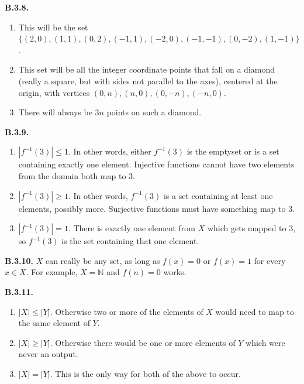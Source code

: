 \documentclass[10pt,]{book}
\theoremstyle{plain}
\theoremstyle{definition}
\theoremstyle{definition}
\theoremstyle{definition}
\theoremstyle{definition}
\numberwithin{equation}{chapter}
\def\N{\mathbb N}
\def\inv{^{-1}}
\begin{document}
%
\par\smallskip
\noindent\textbf{B.3.8.} \hypertarget{p-1834}{}%
\leavevmode%
\begin{enumerate}[label=(\alph*)]
\item\hypertarget{li-602}{}\hypertarget{p-1835}{}%
This will be the set \(\{(2,0), (1,1), (0,2), (-1,1), (-2,0), (-1,-1), (0,-2), (1,-1)\}\).%
\item\hypertarget{li-603}{}\hypertarget{p-1836}{}%
This set will be all the integer coordinate points that fall on a diamond (really a square, but with sides not parallel to the axes), centered at the origin, with vertices \((0,n), (n,0), (0,-n), (-n,0)\).%
\item\hypertarget{li-604}{}\hypertarget{p-1837}{}%
There will always be \(3n\) points on such a diamond.%
\end{enumerate}
%
\par\smallskip
\noindent\textbf{B.3.9.} \hypertarget{p-1842}{}%
\leavevmode%
\begin{enumerate}[label=(\alph*)]
\item\hypertarget{li-608}{}\hypertarget{p-1843}{}%
\(|f\inv(3)| \le 1\). In other words, either \(f\inv(3)\) is the emptyset or is a set containing exactly one element. Injective functions cannot have two elements from the domain both map to 3.%
\item\hypertarget{li-609}{}\hypertarget{p-1844}{}%
\(|f\inv(3)| \ge 1\). In other words, \(f\inv(3)\) is a set containing at least one elements, possibly more. Surjective functions must have something map to 3.%
\item\hypertarget{li-610}{}\hypertarget{p-1845}{}%
\(|f\inv(3)| = 1\). There is exactly one element from \(X\) which gets mapped to 3, so \(f\inv(3)\) is the set containing that one element.%
\end{enumerate}
%
\par\smallskip
\noindent\textbf{B.3.10.} \hypertarget{p-1847}{}%
\(X\) can really be any set, as long as \(f(x) = 0\) or \(f(x) = 1\) for every \(x \in X\). For example, \(X = \N\) and \(f(n) = 0\) works.%
\par\smallskip
\noindent\textbf{B.3.11.} \hypertarget{p-1852}{}%
\leavevmode%
\begin{enumerate}[label=(\alph*)]
\item\hypertarget{li-614}{}\hypertarget{p-1853}{}%
\(|X| \le |Y|\). Otherwise two or more of the elements of \(X\) would need to map to the same element of \(Y\).%
\item\hypertarget{li-615}{}\hypertarget{p-1854}{}%
\(|X| \ge |Y|\). Otherwise there would be one or more elements of \(Y\) which were never an output.%
\item\hypertarget{li-616}{}\hypertarget{p-1855}{}%
\(|X| = |Y|\). This is the only way for both of the above to occur.%
\end{enumerate}
\end{document}

